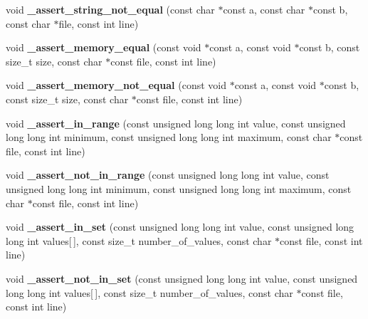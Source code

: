 \begin{DoxyCompactItemize}
void {\bfseries \+\_\+assert\+\_\+string\+\_\+not\+\_\+equal} (const char $\ast$const a, const char $\ast$const b, const char $\ast$file, const int line)
\item 
\mbox{\label{group__cmocka_gada39ba99b07fe88bbf9d42456a365abc}} 
void {\bfseries \+\_\+assert\+\_\+memory\+\_\+equal} (const void $\ast$const a, const void $\ast$const b, const size\+\_\+t size, const char $\ast$const file, const int line)
\item 
\mbox{\label{group__cmocka_ga7b3c47423bceafaeb60e7248c4a1b807}} 
void {\bfseries \+\_\+assert\+\_\+memory\+\_\+not\+\_\+equal} (const void $\ast$const a, const void $\ast$const b, const size\+\_\+t size, const char $\ast$const file, const int line)
\item 
\mbox{\label{group__cmocka_ga49f17dd3fe9a4c47127a66ba472efc4d}} 
void {\bfseries \+\_\+assert\+\_\+in\+\_\+range} (const unsigned long long int value, const unsigned long long int minimum, const unsigned long long int maximum, const char $\ast$const file, const int line)
\item 
\mbox{\label{group__cmocka_ga1de53fd6d9604766c3d83de1afe70751}} 
void {\bfseries \+\_\+assert\+\_\+not\+\_\+in\+\_\+range} (const unsigned long long int value, const unsigned long long int minimum, const unsigned long long int maximum, const char $\ast$const file, const int line)
\item 
\mbox{\label{group__cmocka_ga2cb15b92a8fb97d33dd57caeafa50c54}} 
void {\bfseries \+\_\+assert\+\_\+in\+\_\+set} (const unsigned long long int value, const unsigned long long int values\mbox{[}$\,$\mbox{]}, const size\+\_\+t number\+\_\+of\+\_\+values, const char $\ast$const file, const int line)
\item 
\mbox{\label{group__cmocka_ga7e1bd3a18b67e941bb6f0c3af831858f}} 
void {\bfseries \+\_\+assert\+\_\+not\+\_\+in\+\_\+set} (const unsigned long long int value, const unsigned long long int values\mbox{[}$\,$\mbox{]}, const size\+\_\+t number\+\_\+of\+\_\+values, const char $\ast$const file, const int line)
\item 
\mbox{\label{group__cmocka_gac0f84cf850df35b390f2f85de0a6de64}} 

\end{DoxyCompactItemize}
